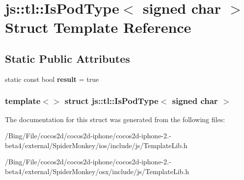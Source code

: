 \hypertarget{structjs_1_1tl_1_1_is_pod_type_3_01signed_01char_01_4}{\section{js\-:\-:tl\-:\-:Is\-Pod\-Type$<$ signed char $>$ Struct Template Reference}
\label{structjs_1_1tl_1_1_is_pod_type_3_01signed_01char_01_4}
}
\subsection*{Static Public Attributes}
\begin{DoxyCompactItemize}
\item 
\hypertarget{structjs_1_1tl_1_1_is_pod_type_3_01signed_01char_01_4_a019f1fbd4315d3b7206f6f0b2e90a472}{static const bool {\bfseries result} = true}\label{structjs_1_1tl_1_1_is_pod_type_3_01signed_01char_01_4_a019f1fbd4315d3b7206f6f0b2e90a472}

\end{DoxyCompactItemize}
\subsubsection*{template$<$$>$ struct js\-::tl\-::\-Is\-Pod\-Type$<$ signed char $>$}



The documentation for this struct was generated from the following files\-:\begin{DoxyCompactItemize}
\item 
/\-Bing/\-File/cocos2d/cocos2d-\/iphone/cocos2d-\/iphone-\/2.-\/beta4/external/\-Spider\-Monkey/ios/include/js/Template\-Lib.\-h\item 
/\-Bing/\-File/cocos2d/cocos2d-\/iphone/cocos2d-\/iphone-\/2.-\/beta4/external/\-Spider\-Monkey/osx/include/js/Template\-Lib.\-h\end{DoxyCompactItemize}
